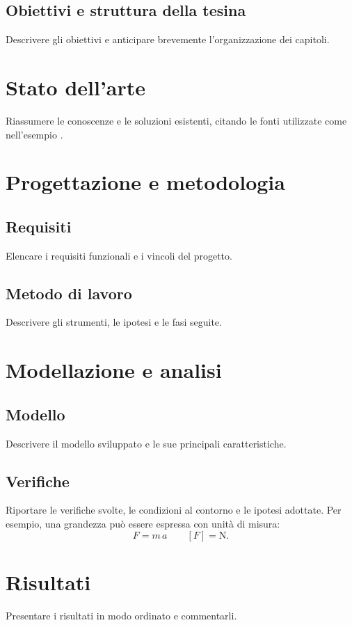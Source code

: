\documentclass[12pt,a4paper,oneside]{report}
\begin{document}
\section{Obiettivi e struttura della tesina}
Descrivere gli obiettivi e anticipare brevemente l'organizzazione dei capitoli.

\chapter{Stato dell'arte}
Riassumere le conoscenze e le soluzioni esistenti, citando le fonti utilizzate
come nell'esempio \cite{riferimento-esempio}.

\chapter{Progettazione e metodologia}
\section{Requisiti}
Elencare i requisiti funzionali e i vincoli del progetto.

\section{Metodo di lavoro}
Descrivere gli strumenti, le ipotesi e le fasi seguite.

\chapter{Modellazione e analisi}
\section{Modello}
Descrivere il modello sviluppato e le sue principali caratteristiche.

\section{Verifiche}
Riportare le verifiche svolte, le condizioni al contorno e le ipotesi adottate.
Per esempio, una grandezza può essere espressa con unità di misura:
\[
    F = m\,a \qquad [F] = \si{\newton}.
\]

\chapter{Risultati}
Presentare i risultati in modo ordinato e commentarli.
\end{document}
